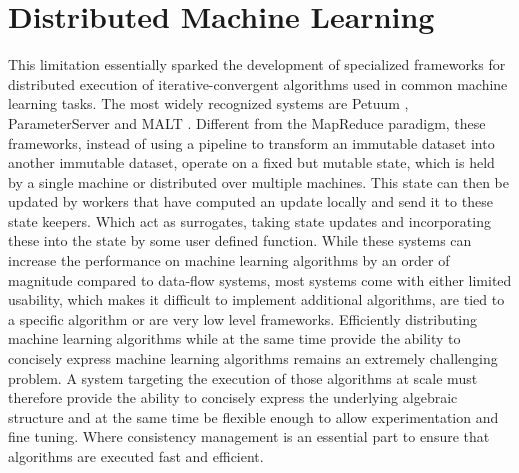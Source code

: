 \section{Distributed Machine Learning}
This limitation essentially sparked the development of specialized frameworks for distributed execution of iterative-convergent algorithms used in common machine learning tasks.
The most widely recognized systems are Petuum \cite{Xing2015}, ParameterServer \cite{Li2014} and MALT \cite{Li2015}.
Different from the MapReduce paradigm, these frameworks, instead of using a pipeline to transform an immutable dataset into another immutable dataset, operate on a fixed but mutable state, which is held by a single machine or distributed over multiple machines.
This state can then be updated by workers that have computed an update locally and send it to these state keepers. Which act as surrogates, taking state updates and incorporating these into the state by some user defined function.
While these systems can increase the performance on machine learning algorithms by an order of magnitude \cite{Xing2015} compared to data-flow systems, most systems come with either limited usability, which makes it difficult to implement additional algorithms, are tied to a specific algorithm or are very low level frameworks.
Efficiently distributing machine learning algorithms while at the same time provide the ability to concisely express machine learning algorithms remains an extremely challenging problem.
A system targeting the execution of those algorithms at scale must therefore provide the ability to concisely express the underlying algebraic structure and at the same time be flexible enough to allow experimentation and fine tuning.
Where consistency management is an essential part to ensure that algorithms are executed fast and efficient.



